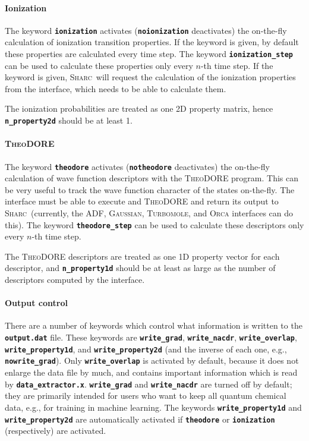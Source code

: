 \documentclass[a4paper,10pt,DIV=15,openany]{scrbook}
\newcommand{\sharc}{\textsc{Sharc}}
\newcommand{\ttt}[1]{\textbf{\texttt{#1}}}
\begin{document}
\paragraph{Ionization}

The keyword \ttt{ionization} activates (\ttt{noionization} deactivates) the on-the-fly calculation of ionization transition properties. If the keyword is given, by default these properties are calculated every time step. The keyword \ttt{ionization\_step} can be used to calculate these properties only every $n$-th time step. 
If the keyword is given, \sharc\ will request the calculation of the ionization properties from the interface, which needs to be able to calculate them.

The ionization probabilities are treated as one 2D property matrix, hence \ttt{n\_property2d} should be at least 1.

\paragraph{\textsc{TheoDORE}}

The keyword \ttt{theodore} activates (\ttt{notheodore} deactivates) the on-the-fly calculation of wave function descriptors with the \textsc{TheoDORE} program. This can be very useful to track the wave function character of the states on-the-fly.
The interface must be able to execute and \textsc{TheoDORE} and return its output to \sharc\ (currently, the ADF, \textsc{Gaussian}, \textsc{Turbomole}, and \textsc{Orca} interfaces can do this). The keyword \ttt{theodore\_step} can be used to calculate these descriptors only every $n$-th time step. 

The \textsc{TheoDORE} descriptors are treated as one 1D property vector for each descriptor, and \ttt{n\_property1d} should be at least as large as the number of descriptors computed by the interface.

\paragraph{Output control}

There are a number of keywords which control what information is written to the \ttt{output.dat} file.
These keywords are \ttt{write\_grad}, \ttt{write\_nacdr}, \ttt{write\_overlap}, \ttt{write\_property1d}, and \ttt{write\_property2d} (and the inverse of each one, e.g., \ttt{nowrite\_grad}).
Only \ttt{write\_overlap} is activated by default, because it does not enlarge the data file by much, and contains important information which is read by \ttt{data\_extractor.x}.
\ttt{write\_grad} and \ttt{write\_nacdr} are turned off by default; they are primarily intended for users who want to keep all quantum chemical data, e.g., for training in machine learning.
The keywords \ttt{write\_property1d} and \ttt{write\_property2d} are automatically activated if \ttt{theodore} or \ttt{ionization} (respectively) are activated.
\end{document}
